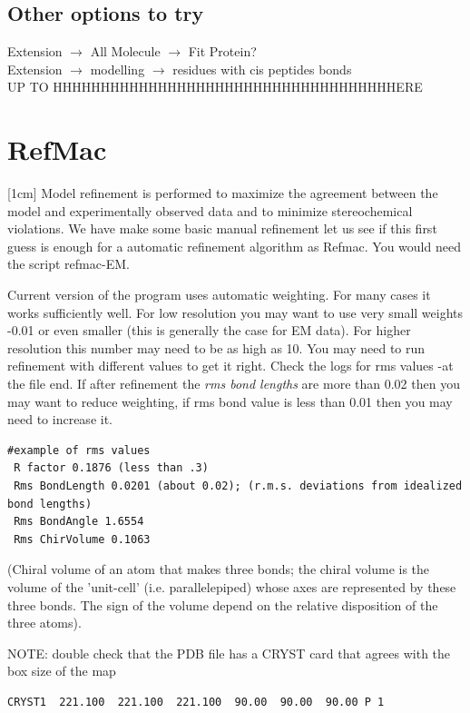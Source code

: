 \documentclass[12pt]{article} %
\newcommand{\iii}[1]{\textit{#1}}
\begin{document}
\subsection{Other options to try}
 Extension $\rightarrow$ All Molecule $\rightarrow$ Fit Protein?\\
 Extension $\rightarrow$ modelling $\rightarrow$ residues with cis peptides bonds\\

\newpage
UP TO HHHHHHHHHHHHHHHHHHHHHHHHHHHHHHHHHHHHERE



\section{RefMac}
[1cm]
Model refinement is performed to maximize the agreement between the model and experimentally observed data and to minimize stereochemical violations. We have make some basic manual refinement let us see if this first guess is enough for a automatic refinement algorithm as Refmac. You would need the script refmac-EM.

Current version of the program uses automatic weighting. For many cases it works
sufficiently well. For low resolution you may want to
use very small weights -0.01 or even smaller (this is generally the case for EM data). For higher resolution this number may need to be as high as 10. You may need to run refinement with different
values to get it right. Check the logs for rms values -at the file end. If after refinement the \iii{rms bond lengths} are more than 0.02 then you may want to reduce weighting, if rms bond value is less than 0.01 then you may need to increase it. 

\begin{verbatim}
#example of rms values
 R factor 0.1876 (less than .3)
 Rms BondLength 0.0201 (about 0.02); (r.m.s. deviations from idealized bond lengths)
 Rms BondAngle 1.6554
 Rms ChirVolume 0.1063
\end{verbatim}


(Chiral volume of an atom that makes three bonds; the chiral volume is the volume of the 'unit-cell' (i.e. parallelepiped) whose axes are represented by these three bonds. The sign of the volume depend on the relative disposition of the three atoms).

NOTE: double check that the PDB file has a  CRYST card that agrees with the box size of the map
\begin{verbatim}
CRYST1  221.100  221.100  221.100  90.00  90.00  90.00 P 1   
\end{verbatim}
\end{document}
